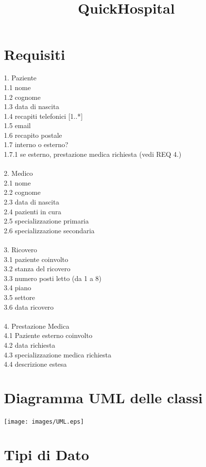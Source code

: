 \documentclass[12pt, letterpaper]{article}
\title{\textbf{QuickHospital}}
\date{}
\newcommand{\acc}{\\\hphantom{}\\}
\newcommand{\id}{{\hphantom{ident}}}
\begin{document}
\maketitle

\tableofcontents 

\section{Requisiti}
1. Paziente \\ 
\id 1.1 nome \\
\id 1.2 cognome \\
\id 1.3 data di nascita \\ 
\id 1.4 recapiti telefonici [1..*] \\ 
\id 1.5 email \\ 
\id 1.6 recapito postale  \\
\id 1.7 interno o esterno? \\ 
\id \id 1.7.1 se esterno, prestazione medica richiesta (vedi REQ 4.)
\acc 
2. Medico \\ 
\id 2.1 nome \\ 
\id 2.2 cognome \\ 
\id 2.3 data di nascita \\ 
\id 2.4 pazienti in cura \\ 
\id 2.5 specializzazione primaria\\
\id 2.6 specializzazione secondaria\acc 
3. Ricovero \\ 
\id 3.1 paziente coinvolto \\ 
\id 3.2 stanza del ricovero \\ 
\id \id 3.3 numero posti letto (da 1 a 8)\\
\id \id 3.4 piano \\ 
\id \id 3.5 settore \\ 
\id \id 3.6 data ricovero \acc 
4. Prestazione Medica \\ 
\id 4.1 Paziente esterno coinvolto \\
\id 4.2 data richiesta \\
\id 4.3 specializzazione medica richiesta \\
\id 4.4 descrizione estesa
\newpage 
\section{Diagramma UML delle classi}
\begin{center}
    \texttt{[image: images/UML.eps]}
\end{center}
\section{Tipi di Dato}
\end{document}
